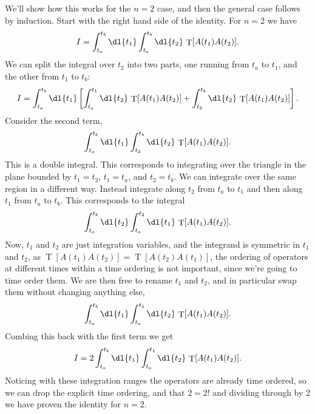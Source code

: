 \documentclass[fleqn]{NotesClass}
\DeclareMathOperator{\timeOrdering}{T}
\begin{document}
    We'll show how this works for the \(n = 2\) case, and then the general case follows by induction.
    Start with the right hand side of the identity.
    For \(n = 2\) we have
    \begin{equation}
        I = \int_{t_a}^{t_b} \dl{t_1} \int_{t_a}^{t_b} \dl{t_2} \, \timeOrdering[A(t_1)A(t_2)].
    \end{equation}
    We can split the integral over \(t_2\) into two parts, one running from \(t_a\) to \(t_1\), and the other from \(t_1\) to \(t_b\):
    \begin{equation}
        I = \int_{t_a}^{t_b} \dl{t_1} \left[ \int_{t_a}^{t_1} \dl{t_2} \, \timeOrdering[A(t_1)A(t_2)] + \int_{t_2}^{t_b} \dl{t_2} \, \timeOrdering[A(t_1) A(t_2)] \right].
    \end{equation}
    Consider the second term,
    \begin{equation}
        \int_{t_a}^{t_b} \dl{t_1} \int_{t_2}^{t_b} \dl{t_2} \, \timeOrdering[A(t_1) A(t_2)].
    \end{equation}
    This is a double integral.
    This corresponds to integrating over the triangle in the plane bounded by \(t_1 = t_2\), \(t_1 = t_a\), and \(t_2 = t_b\).
    We can integrate over the same region in a different way.
    Instead integrate along \(t_2\) from \(t_a\) to \(t_1\) and then along \(t_1\) from \(t_a\) to \(t_b\).
    This corresponds to the integral
    \begin{equation}
        \int_{t_a}^{t_b} \dl{t_2} \int_{t_a}^{t_2} \dl{t_1} \, \timeOrdering[A(t_1)A(t_2)].
    \end{equation}
    Now, \(t_1\) and \(t_2\) are just integration variables, and the integrand is symmetric in \(t_1\) and \(t_2\), as \(\timeOrdering[A(t_1)A(t_2)] = \timeOrdering[A(t_2)A(t_1)]\), the ordering of operators at different times within a time ordering is not important, since we're going to time order them.
    We are then free to rename \(t_1\) and \(t_2\), and in particular swap them without changing anything else,
    \begin{equation}
        \int_{t_a}^{t_b} \dl{t_1} \int_{t_a}^{t_1} \dl{t_2} \, \timeOrdering[A(t_1) A(t_2)].
    \end{equation}
    Combing this back with the first term we get
    \begin{equation}
        I = 2 \int_{t_a}^{t_b} \dl{t_1} \int_{t_a}^{t_1} \dl{t_2} \, \timeOrdering[A(t_1)A(t_2)].
    \end{equation}
    Noticing with these integration ranges the operators are already time ordered, so we can drop the explicit time ordering, and that \(2 = 2!\) and dividing through by 2 we have proven the identity for \(n = 2\).
    
\end{document}
